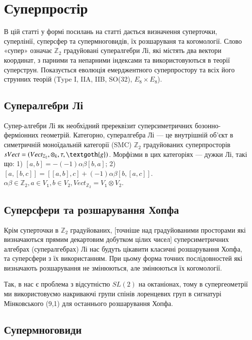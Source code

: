 \section{Суперпростір}

В цій статті у формі посилань на статті дається визначення суперточки,
суперлінії, суперсфер та супермноговидів, їх розшаруваня та когомології.
Слово «супер» означає $\mathbb{Z}_2$ градуйовані супералгебри Лі, які містять два
вектори координат, з парними та непарними індексами та використовуються в теорії
суперструн. Показується еволюція емерджентного суперпростору та всіх його струнних
теорій (Type I, IIA, IIB, SO(32), $E_8\times E_8$).

\subsection*{Супералгебри Лі}

Супер-алгебри Лі як необхідний пререквізит суперсиметричних
бозонно-ферміонних геометрій. Категорно, супералгебра Лі --- це
внутрішній об'єкт в симетричній моноїдальній категорії (SMC) $\mathbb{Z}_2$
градуйованих суперпросторів $sVect = (Vect_{\mathbb{Z}_2},\otimes_k, \tau, \textgoth{g})$.
Морфізми в цих категоріях --- дужки Лі, такі що:
1) $[a,b] = -(-1)\alpha\beta[b,a]$;
2) $[a,[b,c]]=[[a,b],c]+(-1)\alpha\beta[b,[a,c]]$.
$\alpha\beta \in \mathbb{Z}_2, a \in V_𝟷, b \in V_2, Vect_{\mathbb{Z}_2}=V_𝟷\otimes V_2$.

\subsection*{Суперсфери та розшарування Хопфа}

Крім суперточки в $\mathbb{Z}_2$ градуйованих, [точніше над градуйованими
просторами які визначаються прямим декартовим добутком цілих чисел]
суперсиметричних алгебрах (супералгебрах) Лі нас будуть цікавити
класичні розшарування Хопфа, та суперсфери з їх використанням.
При цьому форма точних послідовностей які визначають розшарування
не змінюються, але змінюються їх когомології.

Так, в нас є проблема з відсутністю $SL(2)$ на октаніонах,
тому в супергеометрії ми використовуємо накриваючі групи
спінів лоренцевих груп в сигнатурі Мінковського (9,1)
для останнього розшарування Хопфа.

\subsection*{Супермноговиди}


